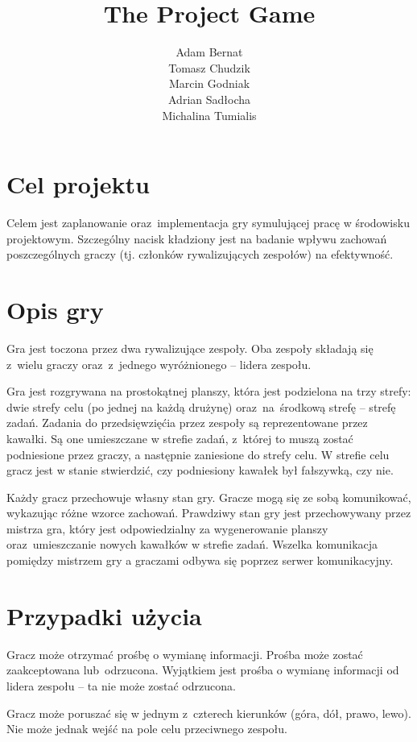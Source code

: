 \documentclass[a4paper]{article}
\title{The Project Game}
\author{
Adam Bernat \\
Tomasz Chudzik \\
Marcin Godniak \\
Adrian Sadłocha \\
Michalina Tumialis
}
\begin{document}
\maketitle
\tableofcontents
\newpage

\section{Cel projektu}

Celem jest zaplanowanie oraz~implementacja gry symulującej pracę w środowisku projektowym.
Szczególny nacisk kładziony jest na badanie wpływu zachowań poszczególnych graczy (tj. członków rywalizujących zespołów) na efektywność.

\section{Opis gry}

Gra jest toczona przez dwa rywalizujące zespoły.
Oba zespoły składają się z~wielu graczy oraz~z~jednego wyróżnionego -- lidera zespołu.

Gra jest rozgrywana na prostokątnej planszy, która jest podzielona na trzy strefy: dwie strefy celu (po jednej na każdą drużynę) oraz~na~środkową strefę -- strefę zadań.
Zadania do przedsięwzięćia przez zespoły są reprezentowane przez kawałki.
Są one umieszczane w strefie zadań, z~której to muszą zostać podniesione przez graczy, a następnie zaniesione do strefy celu.
W strefie celu gracz jest w stanie stwierdzić, czy podniesiony kawałek był fałszywką, czy nie.

Każdy gracz przechowuje własny stan gry.
Gracze mogą się ze sobą komunikować, wykazując różne wzorce zachowań.
Prawdziwy stan gry jest przechowywany przez mistrza gra, który jest odpowiedzialny za wygenerowanie planszy oraz~umieszczanie nowych kawałków w strefie zadań.
Wszelka komunikacja pomiędzy mistrzem gry a graczami odbywa się poprzez serwer komunikacyjny.

\newpage

\section{Przypadki użycia}

Gracz może otrzymać prośbę o wymianę informacji.
Prośba może zostać zaakceptowana lub~odrzucona.
Wyjątkiem jest prośba o wymianę informacji od lidera zespołu -- ta nie może zostać odrzucona.

Gracz może poruszać się w jednym z~czterech kierunków (góra, dół, prawo, lewo).
Nie może jednak wejść na pole celu przeciwnego zespołu.
\end{document}
